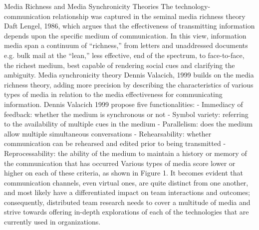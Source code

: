 Media Richness and Media Synchronicity Theories 
The technology-communication relationship was captured in the seminal media richness theory Daft  Lengel, 1986, which argues that the effectiveness of transmitting information depends upon the specific medium of communication. In this view, information media span a continuum of “richness,” from letters and unaddressed documents e.g. bulk mail at the “lean,” less effective, end of the spectrum, to face-to-face, the richest medium, best capable of rendering social cues and clarifying the ambiguity.
Media synchronicity theory Dennis  Valacich, 1999 builds on the media richness theory, adding more precision by describing the characteristics of various types of media in relation to the media effectiveness for communicating information. Dennis  Valacich 1999 propose five functionalities:
    	-  Immediacy of feedback: whether the medium is synchronous or not
    	-  Symbol variety: referring to the availability of multiple cues in the medium
    	-  Parallelism: does the medium allow multiple simultaneous conversations
    	-  Rehearsability: whether communication can be rehearsed and edited prior to being transmitted 
    	-  Reprocessability: the ability of the medium to maintain a history or memory of the communication that has occurred
Various types of media score lower or higher on each of these criteria, as shown in Figure 1.
It becomes evident that communication channels, even virtual ones, are quite distinct from one another, and most likely have a differentiated impact on team interactions and outcomes; consequently, distributed team research needs to cover a multitude of media and strive towards offering in-depth explorations of each of the technologies that are currently used in organizations. 

